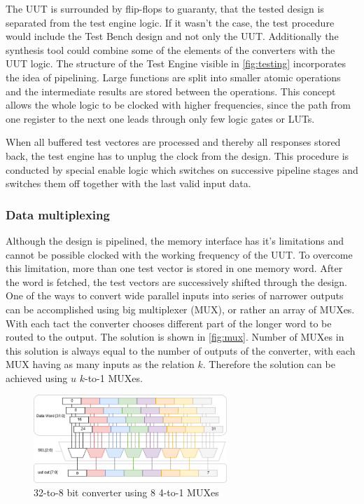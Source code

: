 The UUT is surrounded by flip-flops to guaranty, that the tested design is separated from the test engine logic. If it wasn't the case, the test procedure would include the Test Bench design and not only the UUT. Additionally the synthesis tool could combine some of the elements of the converters with the UUT logic. The structure of the Test Engine visible in \autoref{fig:testing} incorporates the idea of pipelining. Large functions are split into smaller atomic operations and the intermediate results are stored between the operations. This concept allows the whole logic to be clocked with higher frequencies, since the path from one register to the next one leads through only few logic gates or LUTs. 

When all buffered test vectores are processed and thereby all responses stored back, the test engine has to unplug the clock from the design. This procedure is conducted by special enable logic which switches on successive pipeline stages and switches them off together with the last valid input data.

\subsubsection{Data multiplexing}\label{subsec:mux}
Although the design is pipelined, the memory interface has it's limitations and cannot be possible clocked with the working frequency of the UUT. To overcome this limitation, more than one test vector is stored in one memory word. After the word is fetched, the test vectors are successively shifted through the design. One of the ways to convert wide parallel inputs into series of narrower outputs can be accomplished using big multiplexer (MUX), or rather an array of MUXes. With each tact the converter chooses different part of the longer word to be routed to the output. The solution is shown in \autoref{fig:mux}. Number of MUXes in this solution is always equal to the number of outputs of the converter, with each MUX having as many inputs as the relation $k$. Therefore the solution can be achieved using $u$ $k$-to-1 MUXes.
\begin{figure}[h]
\centering
\includegraphics[width=0.65\textwidth]{figures/MUX.png}
\caption{32-to-8 bit converter using 8 4-to-1 MUXes}
\label{fig:mux}
\end{figure}


